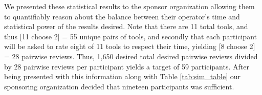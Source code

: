 We presented these statistical results to the sponsor organization allowing them to quantifiably reason about the balance between their operator's time and statistical power of the results desired. Note that there are 11 total tools, and thus [11 choose 2] = 55 unique pairs of tools, and secondly that each participant will be asked to rate eight of 11 tools to respect their time, yielding [8 choose 2] = 28 pairwise reviews. Thus, 1,650 desired total desired pairwise reviews divided by 28 pairwise reviews per participant yields a target of 59 participants. After being presented with this information along with Table \ref{tab:sim_table} our sponsoring organization decided that nineteen participants was sufficient. 
